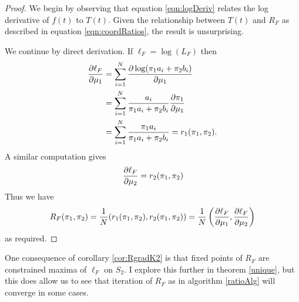 \begin{proof}
	We begin by observing that equation \eqref{eqn:logDeriv} relates the log derivative of \( f(t) \) to \( T(t) \).  Given the relationship between \( T(t) \) and \( R_F \) as described in equation \eqref{eqn:coordRatios}, the result is unsurprising.
	
	We continue by direct derivation. If \( \ell_F = \log(L_F) \) then 
	\begin{align}\label{eqn:ellDeriv}
		\pdv{\ell_F}{\mu_1} &= \sum_{i=1}^{N} \pdv{\log(\pi_1a_i+\pi_2b_i)}{\mu_1}\nonumber \\
							&= \sum_{i=1}^{N} \frac{a_i}{\pi_1a_i+\pi_2b_i}\pdv{\pi_1}{\mu_1} \\
							&= \sum_{i=1}^{N} \frac{\pi_1a_i}{\pi_1a_i+\pi_2b_i} = r_1(\pi_1,\pi_2).\nonumber
	\end{align}
	A similar computation gives 
	\[\pdv{\ell_F}{\mu_2} = r_2(\pi_1,\pi_2)\]
	Thus we have 
	\begin{equation}\label{eqn:RgradK2}
		R_F(\pi_1,\pi_2) = \frac 1N (r_1(\pi_1,\pi_2),r_2(\pi_1,\pi_2)) = \frac 1N \left(\pdv{\ell_F}{\mu_1} ,\pdv{\ell_F}{\mu_2} \right)
	\end{equation}
	as required.
\end{proof}

One consequence of corollary \ref{cor:RgradK2} is that fixed points of \( R_F \) are constrained maxima of \( \ell_F \) on \(S_2\).  I explore this further in theorem \ref{unique}, but this does allow us to see that iteration of \( R_F \) as in algorithm \ref{ratioAlg} will converge in some cases.

